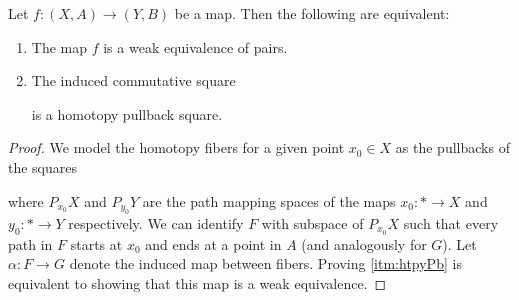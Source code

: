 \begin{lemma}\label{lem:weOfaPairsIsHtpyPb}
    Let $f\colon(X,A)\to (Y,B)$ be a map.
    Then the following are equivalent:
    \begin{enumerate}[label={(\roman*)}]
        \item The map $f$ is a weak equivalence of pairs. \label{itm:weOfPairs}
        \item The induced commutative square \begin{center} 
        \end{center}
        is a homotopy pullback square. \label{itm:htpyPb}
    \end{enumerate}
    \begin{proof}
        We model the homotopy fibers for a given point $x_0\in X$ as the pullbacks of the squares
        \begin{center} 
        \end{center}
        where $P_{x_0}X$ and $P_{y_0}Y$ are the path mapping spaces of the maps $x_0\colon *\to X$ and  $y_0\colon *\to Y$ respectively.
        We can identify $F$ with subspace of $P_{x_0}X$ such that every path in $F$ starts at $x_0$ and ends at a point in $A$ (and analogously for $G$).
        Let $\alpha\colon F\to G$ denote the induced map between fibers.
        Proving \ref{itm:htpyPb} is equivalent to showing that this map is a weak equivalence.


\end{proof}
\end{lemma}
